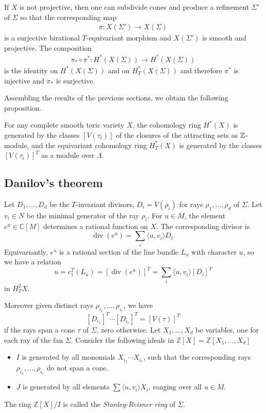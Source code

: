 If $X$ is not projective, then one can subdivide cones and produce
a refinement $\Sigma'$ of $\Sigma$ so that the corresponding map \begin{align*}
	\pi: X(\Sigma') \to X(\Sigma)
\end{align*} is a surjective birational $T$-equivariant morphism and
$X(\Sigma')$ is smooth and projective. The composition \begin{align*}
	\pi_*\circ \pi^*: H^*(X(\Sigma)) \to H^*(X(\Sigma))
\end{align*} is the identity on $H^*(X(\Sigma))$ and on $H^*_T(X(\Sigma))$
and therefore $\pi^*$ is injective and $\pi_*$ is surjective.

Assembling the results of the previous sections, we obtain the following proposition.

\begin{proposition}
	For any complete smooth toric variety $X$, the cohomology ring $H^*(X)$
	is generated by the classes $[V(\tau_i)]$ of the closures of the attracting sets
	as $\mathbb{Z}$-module, and the equivariant cohomology ring $H^*_T(X)$ is generated
	by the classes $[V(\tau_i)]^T$ as a module over $\Lambda$.
\end{proposition}

\subsection{Danilov's theorem}
Let \( D_1, \ldots, D_d \) be the \( T \)-invariant divisors, \( D_i = V(\rho_i) \) for rays \( \rho_1, \ldots, \rho_d \) of \( \Sigma \). Let \( v_i \in N \) be the minimal generator of the ray \( \rho_i \). For \( u \in M \), the element \( e^u \in \mathbb{C}[M] \) determines a rational function on \( X \). The corresponding divisor is
\[
	\operatorname{div}(e^u) = \sum_i \langle u, v_i \rangle D_i.
\]
Equivariantly, \( e^u \) is a rational section of the line bundle \( L_u \) with character \( u \), so we have a relation
\[
	u = c_1^T(L_u) = \left[\operatorname{div}(e^u)\right]^T = \sum_i \langle u, v_i \rangle [D_i]^T
\]
in \( H_T^2 X \).

Moreover given distinct rays \( \rho_{i_1}, \ldots, \rho_{i_r} \), we have
\[
	[D_{i_1}]^T \cdots [D_{i_r}]^T = [V(\tau)]^T
\]
if the rays span a cone \( \tau \) of \( \Sigma \),  zero otherwise.
Let \( X_1, \ldots, X_d \) be variables, one for each ray of the fan \( \Sigma \). Consider the following ideals
in \( \mathbb{Z}[X] = \mathbb{Z}[X_1, \ldots, X_d] \)
\begin{itemize}
	\item \( I \) is generated by all monomials \( X_{i_1} \cdots X_{i_r} \), such that the corresponding rays \( \rho_{i_1}, \ldots, \rho_{i_r} \) do not span a cone.
	\item \( J \) is generated by all elements \( \sum \langle u, v_i \rangle X_i \), ranging over all \( u \in M \).
\end{itemize}
The ring \( \mathbb{Z}[X] / I \) is called the \emph{Stanley-Reisner ring} of \( \Sigma \).

